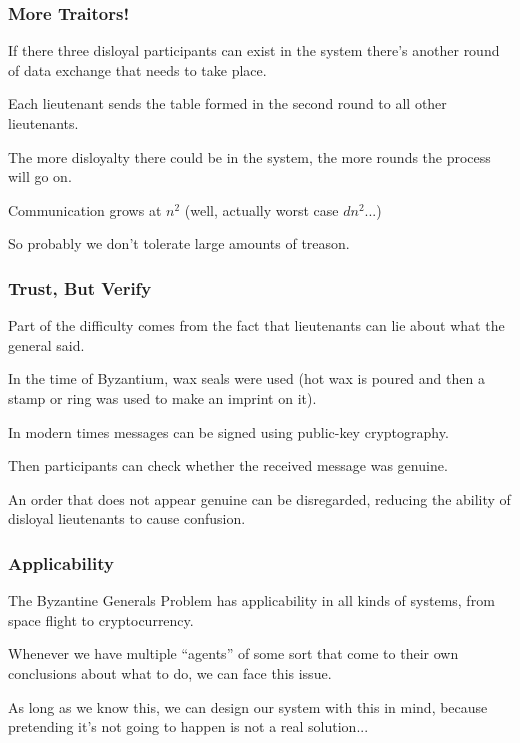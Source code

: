 \begin{frame}
	\frametitle{More Traitors!}

	If there three disloyal participants can exist in the system there's another round of data exchange that needs to take place.

	Each lieutenant sends the table formed in the second round to all other lieutenants.

	The more disloyalty there could be in the system, the more rounds the process will go on.

	Communication grows at $n^{2}$ (well, actually worst case $dn^{2}$...)

	So probably we don't tolerate large amounts of treason.

\end{frame}

\begin{frame}
	\frametitle{Trust, But Verify}

	Part of the difficulty comes from the fact that lieutenants can lie about what the general said.

	In the time of Byzantium, wax seals were used (hot wax is poured and then a stamp or ring was used to make an imprint on it).

	In modern times messages can be signed using public-key cryptography.

	Then participants can check whether the received message was genuine.

	An order that does not appear genuine can be disregarded, reducing the ability of disloyal lieutenants to cause confusion.

\end{frame}

\begin{frame}
	\frametitle{Applicability}

	The Byzantine Generals Problem has applicability in all kinds of systems, from space flight to cryptocurrency.

	Whenever we have multiple ``agents'' of some sort that come to their own conclusions about what to do, we can face this issue.

	As long as we know this, we can design our system with this in mind, because pretending it's not going to happen is not a real solution...


\end{frame}





